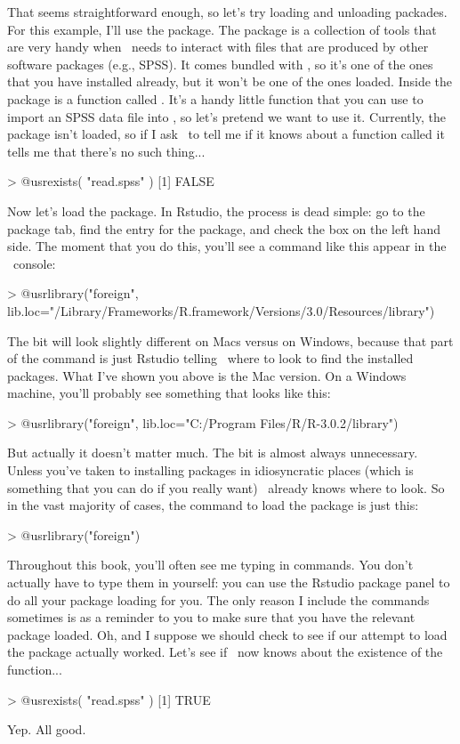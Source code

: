 That seems straightforward enough, so let's try loading and unloading packades. For this example, I'll use the  package. The  package is a collection of tools that are very handy when \R\ needs to interact with files that are produced by other software packages (e.g., SPSS). It comes bundled with \R, so it's one of the ones that you have installed already, but it won't be one of the ones loaded. Inside the  package is a function called . It's a handy little function that you can use to import an SPSS data file into \R, so let's pretend we want to use it. Currently, the  package isn't loaded, so if I ask \R\ to tell me if it knows about a function called  it tells me that there's no such thing...
\begin{rblock1}
> @usr{exists( "read.spss" )}
[1] FALSE 
\end{rblock1}
Now let's load the package. In Rstudio, the process is dead simple: go to the package tab, find the entry for the  package, and check the box on the left hand side. The moment that you do this, you'll see a command like this appear in the \R\ console:
\begin{rblock1}
> @usr{library("foreign", lib.loc="/Library/Frameworks/R.framework/Versions/3.0/Resources/library")}
\end{rblock1}
The  bit will look slightly different on Macs versus on Windows, because that part of the command is just Rstudio telling \R\ where to look to find the installed packages. What I've shown you above is the Mac version. On a Windows machine, you'll probably see something that looks like this:
\begin{rblock1}
> @usr{library("foreign", lib.loc="C:/Program Files/R/R-3.0.2/library")}
\end{rblock1}
But actually it doesn't matter much. The  bit is almost always unnecessary. Unless you've taken to installing packages in idiosyncratic places (which is something that you can do if you really want) \R\ already knows where to look. So in the vast majority of cases, the command to load the  package is just this:
\begin{rblock1}
> @usr{library("foreign")}
\end{rblock1}
Throughout this book, you'll often see me typing in  commands. You don't actually have to type them in yourself: you can use the Rstudio package panel to do all your package loading for you. The only reason I include the  commands sometimes is as a reminder to you to make sure that you have the relevant package loaded. Oh, and I suppose we should check to see if our attempt to load the package actually worked. Let's see if \R\ now knows about the existence of the  function...
\begin{rblock1}
> @usr{exists( "read.spss" )}
[1] TRUE 
\end{rblock1}
Yep. All good.



